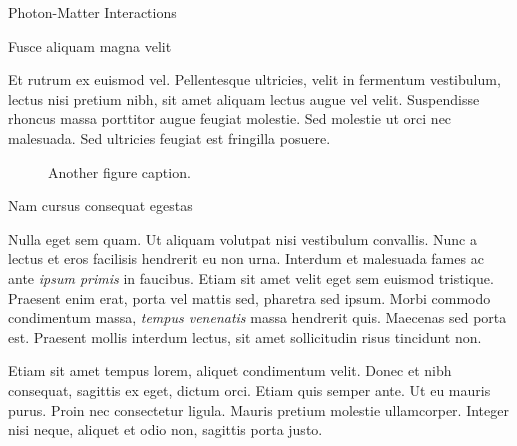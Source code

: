 \documentclass[final]{beamer}
\newlength{\colwidth}
\begin{document}
\begin{frame}[t]
\begin{columns}[t]
\begin{column}{\colwidth}
\begin{block}{Photon-Matter Interactions}
  \end{block}

  \begin{block}{Fusce aliquam magna velit}

    Et rutrum ex euismod vel. Pellentesque ultricies, velit in fermentum
    vestibulum, lectus nisi pretium nibh, sit amet aliquam lectus augue vel
    velit. Suspendisse rhoncus massa porttitor augue feugiat molestie. Sed
    molestie ut orci nec malesuada. Sed ultricies feugiat est fringilla
    posuere.

    \begin{figure}
      \centering
      \caption{Another figure caption.}
    \end{figure}

  \end{block}

  \begin{block}{Nam cursus consequat egestas}

    Nulla eget sem quam. Ut aliquam volutpat nisi vestibulum convallis. Nunc a
    lectus et eros facilisis hendrerit eu non urna. Interdum et malesuada fames
    ac ante \textit{ipsum primis} in faucibus. Etiam sit amet velit eget sem
    euismod tristique. Praesent enim erat, porta vel mattis sed, pharetra sed
    ipsum. Morbi commodo condimentum massa, \textit{tempus venenatis} massa
    hendrerit quis. Maecenas sed porta est. Praesent mollis interdum lectus,
    sit amet sollicitudin risus tincidunt non.

    Etiam sit amet tempus lorem, aliquet condimentum velit. Donec et nibh
    consequat, sagittis ex eget, dictum orci. Etiam quis semper ante. Ut eu
    mauris purus. Proin nec consectetur ligula. Mauris pretium molestie
    ullamcorper. Integer nisi neque, aliquet et odio non, sagittis porta justo.


\end{block}
\end{column}
\end{columns}
\end{frame}
\end{document}
